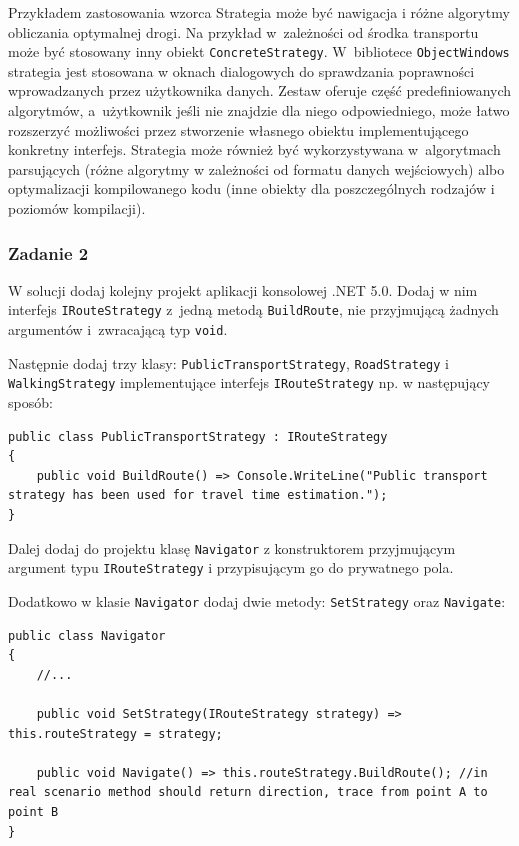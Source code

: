 Przykładem zastosowania wzorca Strategia może być nawigacja i różne algorytmy obliczania optymalnej drogi. Na przykład w~zależności od środka transportu może być stosowany inny obiekt \texttt{ConcreteStrategy}. W~bibliotece \texttt{ObjectWindows} strategia jest stosowana w oknach dialogowych do sprawdzania poprawności wprowadzanych przez użytkownika danych. Zestaw oferuje część predefiniowanych algorytmów, a~użytkownik jeśli nie znajdzie dla niego odpowiedniego, może łatwo rozszerzyć możliwości przez stworzenie własnego obiektu implementującego konkretny interfejs. Strategia może również być wykorzystywana w~algorytmach parsujących (różne algorytmy w zależności od formatu danych wejściowych) albo optymalizacji kompilowanego kodu (inne obiekty dla poszczególnych rodzajów i poziomów kompilacji).

\subsubsection{Zadanie 2}
W solucji dodaj kolejny projekt aplikacji konsolowej .NET 5.0. Dodaj w nim interfejs \texttt{IRouteStrategy} z~jedną metodą \texttt{BuildRoute}, nie przyjmującą żadnych argumentów i~zwracającą typ \texttt{void}. 

Następnie dodaj trzy klasy: \texttt{PublicTransportStrategy}, \texttt{RoadStrategy} i \texttt{WalkingStrategy} implementujące interfejs \texttt{IRouteStrategy} np. w następujący sposób:
\begin{lstlisting}
public class PublicTransportStrategy : IRouteStrategy
{
	public void BuildRoute() => Console.WriteLine("Public transport strategy has been used for travel time estimation.");
}
\end{lstlisting}

Dalej dodaj do projektu klasę \texttt{Navigator} z konstruktorem przyjmującym argument typu \texttt{IRouteStrategy} i przypisującym go do prywatnego pola. 

Dodatkowo w klasie \texttt{Navigator} dodaj dwie metody: \texttt{SetStrategy} oraz \texttt{Navigate}:
\begin{lstlisting}
public class Navigator
{
	//...
	
	public void SetStrategy(IRouteStrategy strategy) => this.routeStrategy = strategy;
	
	public void Navigate() => this.routeStrategy.BuildRoute(); //in real scenario method should return direction, trace from point A to point B
}
\end{lstlisting}

